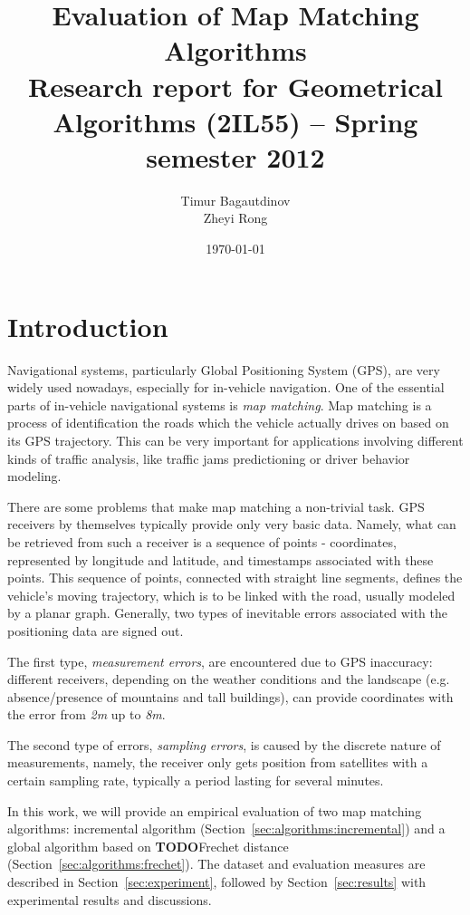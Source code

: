 \documentclass[a4paper,twoside,11pt]{article}
\title{
Evaluation of Map Matching Algorithms \\[1ex]
%
\large Research report for Geometrical Algorithms (2IL55) -- Spring semester 2012}
\author{
  \begin{minipage}[t]{.3\linewidth}
    \centering
    Timur Bagautdinov
  \end{minipage}
  \begin{minipage}[t]{.3\linewidth}
    \centering
    Zheyi Rong
  \end{minipage}
}
\date{\today}
\newcommand{\todo}{\textbf{TODO}}
\theoremstyle{plain}
\theoremstyle{definition}  %
\begin{document}
\maketitle

\begin{abstract}
\end{abstract}

\section{Introduction}
\label{sec:introduction}

Navigational systems, particularly Global Positioning System (GPS), are very widely used nowadays,
especially for in-vehicle navigation.
One of the essential parts of in-vehicle navigational systems is \textit{map matching}. Map matching
is a process of identification the roads which the vehicle actually drives on based on its GPS trajectory.
This can be very important for applications involving different kinds of traffic analysis, like traffic jams predictioning
or driver behavior modeling.

There are some problems that make map matching a non-trivial task.
GPS receivers by themselves typically provide only very basic data.
Namely, what can be retrieved from such a receiver is a sequence of points - coordinates,
represented by longitude and latitude, and timestamps associated with these points.
This sequence of points, connected with straight line segments, defines the vehicle's moving trajectory,
which is to be linked with the road, usually modeled by a planar graph.
Generally, two types of inevitable errors associated with
the positioning data are signed out.

The first type, \textit{measurement errors}, are encountered due to GPS inaccuracy: different receivers, depending
on the weather conditions and the landscape (e.g. absence/presence of mountains and tall buildings),
can provide coordinates with the error from \textit{2m} up to \textit{8m}.

The second type of errors, \textit{sampling errors}, is caused
by the discrete nature of measurements, namely, the receiver only
gets position from satellites with a certain sampling rate, typically
a period lasting for several minutes.

In this work, we will provide an empirical evaluation of two map matching
algorithms: incremental algorithm (Section~\ref{sec:algorithms:incremental}) 
and a global algorithm based on \todo{Frechet distance}
(Section~\ref{sec:algorithms:frechet}).
The dataset and evaluation measures are described in Section~\ref{sec:experiment},
followed by Section~\ref{sec:results} with experimental results and discussions.
\end{document}
